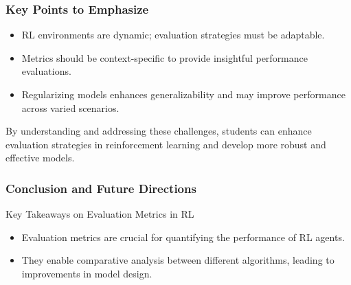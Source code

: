 \documentclass{beamer}
\begin{document}
\begin{frame}[fragile]
    \frametitle{Key Points to Emphasize}
    \begin{itemize}
        \item RL environments are dynamic; evaluation strategies must be adaptable.
        \item Metrics should be context-specific to provide insightful performance evaluations.
        \item Regularizing models enhances generalizability and may improve performance across varied scenarios.
    \end{itemize}

    By understanding and addressing these challenges, students can enhance evaluation strategies in reinforcement learning and develop more robust and effective models.
\end{frame}

\begin{frame}[fragile]
    \frametitle{Conclusion and Future Directions}
    
    \begin{block}{Key Takeaways on Evaluation Metrics in RL}
        \begin{itemize}
            \item Evaluation metrics are crucial for quantifying the performance of RL agents.
            \item They enable comparative analysis between different algorithms, leading to improvements in model design.
        \end{itemize}
    \end{block}
\end{frame}
\end{document}
